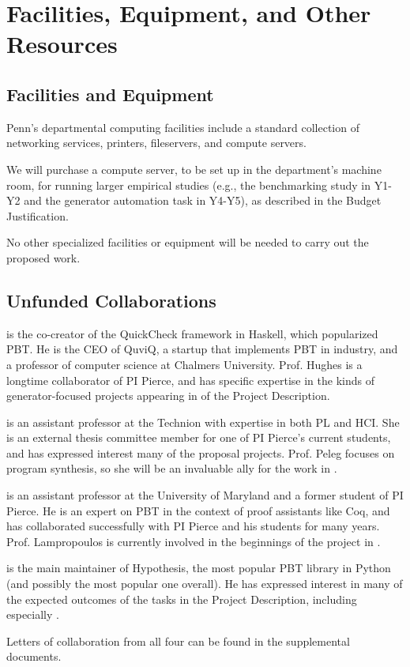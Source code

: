 \section*{Facilities, Equipment, and Other Resources}

\subsection*{Facilities and Equipment}

Penn's departmental computing facilities include a standard collection of
networking services, printers, fileservers, and compute servers.

We will purchase a compute server, to be set up in the department’s
machine room, for running larger empirical studies (e.g., the
benchmarking study in Y1-Y2 and the generator automation task in
Y4-Y5), as described in the Budget Justification.

No other specialized facilities or equipment will be needed to carry
out the proposed work.

\subsection*{Unfunded Collaborations}

 is the co-creator of the QuickCheck framework in
Haskell, which popularized PBT. He is the CEO of QuviQ, a startup that
implements PBT in industry, and a professor of computer science at Chalmers
University.  Prof. Hughes is a longtime collaborator of PI
Pierce, and has specific expertise in the kinds of generator-focused projects
appearing in  of the Project Description.

\smallskip{} is an assistant professor at the Technion with expertise in both
PL and HCI. She is an external thesis committee member for one of PI Pierce's current
students, and has expressed interest many of the proposal projects. Prof. Peleg
focuses on program synthesis, so she will be an invaluable ally for the work in
.

\smallskip{} is an assistant professor at the
University of Maryland and a former student of PI Pierce.  He is an expert on
PBT in the context of proof assistants like Coq, and has collaborated
successfully with PI Pierce and his students for many years. Prof. Lampropoulos
is currently involved in the beginnings of the project in
.

\smallskip{} is the main maintainer of
Hypothesis, the most popular PBT library in Python (and possibly the most
popular one overall). He has expressed interest in many of the expected outcomes
of the tasks in the Project Description, including especially
.

\smallskip

\noindent Letters of collaboration from all four can be found in the supplemental
documents.
